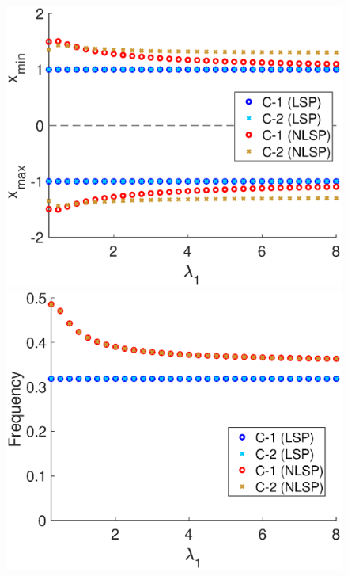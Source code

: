 \begin{figure}[h]
\centering
  \begin{minipage}{0.45\linewidth}
  \begin{center}
\includegraphics[width=1\linewidth]{Images/photo21_1.eps}
\end{center}
  \end{minipage} 
  \begin{minipage}{0.45\linewidth}
  \begin{center}
\includegraphics[width=1\linewidth]{Images/photo21_2.eps}

\end{center}
\end{minipage}
\end{figure}
